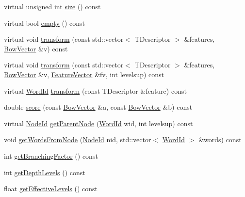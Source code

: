 \begin{DoxyCompactItemize}
\item 
virtual unsigned int \hyperlink{classDBoW2_1_1TemplatedVocabulary_a8baad280d6daf74ee43d7cd911363137}{size} () const
\item 
virtual bool \hyperlink{classDBoW2_1_1TemplatedVocabulary_ad7bbb3cf53f8f9f3610b9b67c551ba8e}{empty} () const
\item 
virtual void \hyperlink{classDBoW2_1_1TemplatedVocabulary_a01de3bebec37624439c7d3baf6651ff0}{transform} (const std\+::vector$<$ T\+Descriptor $>$ \&features, \hyperlink{classDBoW2_1_1BowVector}{Bow\+Vector} \&v) const
\item 
virtual void \hyperlink{classDBoW2_1_1TemplatedVocabulary_af3815440ed610974afc5a2836f54fe07}{transform} (const std\+::vector$<$ T\+Descriptor $>$ \&features, \hyperlink{classDBoW2_1_1BowVector}{Bow\+Vector} \&v, \hyperlink{classDBoW2_1_1FeatureVector}{Feature\+Vector} \&fv, int levelsup) const
\item 
virtual \hyperlink{namespaceDBoW2_ab1a0d3283b2d4690a383372ed20bfeb5}{Word\+Id} \hyperlink{classDBoW2_1_1TemplatedVocabulary_aa5003af19aacb6a322f7fdc0535eb149}{transform} (const T\+Descriptor \&feature) const
\item 
double \hyperlink{classDBoW2_1_1TemplatedVocabulary_aedde9cc3255e41fd0441055eeb640346}{score} (const \hyperlink{classDBoW2_1_1BowVector}{Bow\+Vector} \&a, const \hyperlink{classDBoW2_1_1BowVector}{Bow\+Vector} \&b) const
\item 
virtual \hyperlink{namespaceDBoW2_a3a0fa9c50c0df508759362d6204566f2}{Node\+Id} \hyperlink{classDBoW2_1_1TemplatedVocabulary_a03912634600711fbf70355ed32b07f2c}{get\+Parent\+Node} (\hyperlink{namespaceDBoW2_ab1a0d3283b2d4690a383372ed20bfeb5}{Word\+Id} wid, int levelsup) const
\item 
void \hyperlink{classDBoW2_1_1TemplatedVocabulary_a809f881020a2b953664b1f528828551e}{get\+Words\+From\+Node} (\hyperlink{namespaceDBoW2_a3a0fa9c50c0df508759362d6204566f2}{Node\+Id} nid, std\+::vector$<$ \hyperlink{namespaceDBoW2_ab1a0d3283b2d4690a383372ed20bfeb5}{Word\+Id} $>$ \&words) const
\item 
int \hyperlink{classDBoW2_1_1TemplatedVocabulary_a027d367760c39de816bee5ff0d969837}{get\+Branching\+Factor} () const
\item 
int \hyperlink{classDBoW2_1_1TemplatedVocabulary_a5a7d1b3ad0c705705d516a9a144e3f38}{get\+Depth\+Levels} () const
\item 
float \hyperlink{classDBoW2_1_1TemplatedVocabulary_ae67da4c7b30c15ed4faba2ad6ed4549e}{get\+Effective\+Levels} () const

\end{DoxyCompactItemize}
